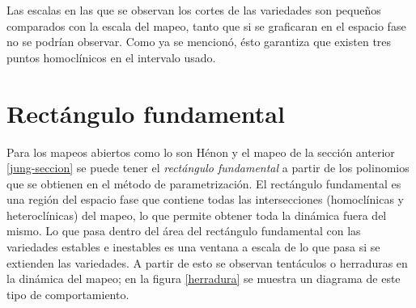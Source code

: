 
Las escalas en las que se observan los cortes de las variedades son pequeños com\-pa\-ra\-dos con la escala del mapeo, tanto que si se graficaran en el espacio fase no se podrían observar. Como ya se mencionó, ésto garantiza que existen tres puntos homoclínicos en el intervalo usado. \\
\linebreak
\linebreak
\linebreak
\linebreak
\linebreak
\linebreak
\linebreak
\linebreak


\label{SeccionRectanguloFundamental}\section{Rectángulo fundamental}
Para los mapeos abiertos como lo son Hénon y el mapeo de la sección anterior \ref{jung-seccion} se puede tener el \textit{rectángulo fundamental} a partir de los polinomios que se obtienen en el método de parametrización. El rectángulo fundamental es una región del espacio fase que contiene todas las intersecciones (homoclínicas y heteroclínicas) del mapeo, lo que permite obtener toda la dinámica fuera del mismo. Lo que pasa dentro del área del rectángulo fundamental con las variedades estables e inestables es una ventana a escala de lo que pasa si se extienden las variedades. A partir de esto se observan tentáculos o herraduras en la dinámica del mapeo; en la figura \ref{herradura} se muestra un diagrama de este tipo de comportamiento.

